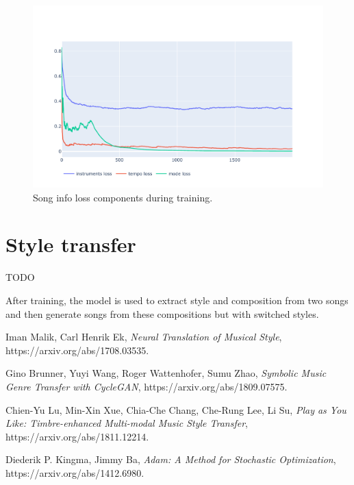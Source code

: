 \documentclass[en]{pracamgr}
\begin{document}
\begin{figure}
    \centering
    \includegraphics[width=\linewidth]{figures/song-info.pdf}
    \caption{Song info loss components during training.}
    \label{fig:song_info}
\end{figure}

\section{Style transfer}

TODO

After training, the model is used to extract style and composition from two songs and then generate songs from these compositions but with switched styles.

\begin{thebibliography}{99}

 Iman Malik, Carl Henrik Ek, \textit{Neural Translation of Musical Style}, https://arxiv.org/abs/1708.03535.

 Gino Brunner, Yuyi Wang, Roger Wattenhofer, Sumu Zhao, \textit{Symbolic Music Genre Transfer with CycleGAN}, https://arxiv.org/abs/1809.07575.

 Chien-Yu Lu, Min-Xin Xue, Chia-Che Chang, Che-Rung Lee, Li Su, \textit{Play as You Like: Timbre-enhanced Multi-modal Music Style Transfer}, https://arxiv.org/abs/1811.12214.

 Diederik P. Kingma, Jimmy Ba, \textit{Adam: A Method for Stochastic Optimization}, https://arxiv.org/abs/1412.6980.

\end{thebibliography}
\end{document}
